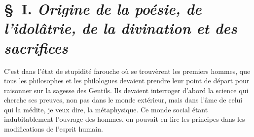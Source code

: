 \documentclass[french,twoside]{book} %
\newcommand\chaptercont{} %
\begin{document}
\chaptercont
\section[{§ I. Origine de la poésie, de l’idolâtrie, de la divination et des sacrifices}]{§ I. {\itshape Origine de la poésie, de l’idolâtrie, de la divination et des sacrifices}}
\par
C’est dans l’état de stupidité farouche où se trouvèrent les premiers hommes, que tous les philosophes et les philologues devaient prendre leur point de départ pour raisonner sur la sagesse des Gentils. Ils devaient interroger d’abord la science qui cherche ses preuves, non pas dans le monde extérieur, mais dans l’âme de celui qui la médite, je veux dire, la métaphysique. Ce monde social étant indubitablement l’ouvrage des hommes, on pouvait en lire les principes dans les modifications de l’esprit humain.\par
\end{document}
